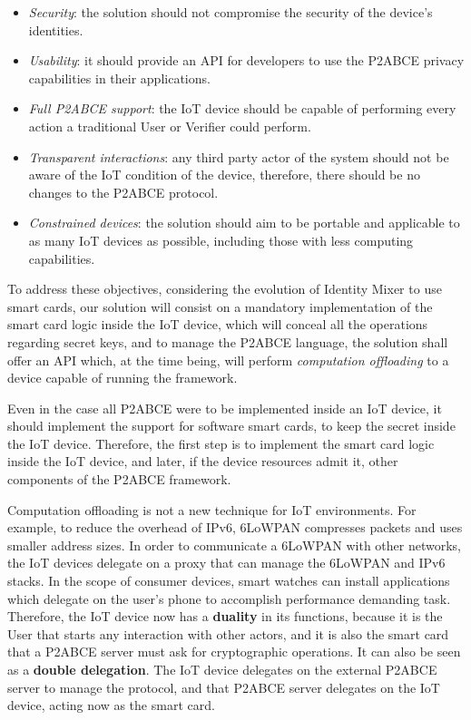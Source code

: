 \begin{itemize}
	\item \textit{Security}: the solution should not compromise the security of the device's identities.
	\item \textit{Usability}: it should provide an API for developers to use the P2ABCE privacy capabilities in their applications.
	\item \textit{Full P2ABCE support}: the IoT device should be capable of performing every action a traditional User or Verifier could perform.
	\item \textit{Transparent interactions}: any third party actor of the system should not be aware of the IoT condition of the device, therefore, there should be no changes to the P2ABCE protocol.
	\item \textit{Constrained devices}: the solution should aim to be portable and applicable to as many IoT devices as possible, including those with less computing capabilities.
\end{itemize}

\hfil

To address these objectives, considering the evolution of Identity Mixer to use smart cards, our solution will consist on a mandatory implementation of the smart card logic inside the IoT device, which will conceal all the operations regarding secret keys, and to manage the P2ABCE language, the solution shall offer an API which, at the time being, will perform \textit{computation offloading} to a device capable of running the framework.

Even in the case all P2ABCE were to be implemented inside an IoT device, it should implement the support for software smart cards, to keep the secret inside the IoT device. Therefore, the first step is to implement the smart card logic inside the IoT device, and later, if the device resources admit it, other components of the P2ABCE framework.

Computation offloading is not a new technique for IoT environments. For example, to reduce the overhead of IPv6, 6LoWPAN compresses packets and uses smaller address sizes. In order to communicate a 6LoWPAN with other networks, the IoT devices delegate on a proxy that can manage the 6LoWPAN and IPv6 stacks. In the scope of consumer devices, smart watches can install applications which delegate on the user's phone to accomplish performance demanding task. 
Therefore, the IoT device now has a \textbf{duality} in its functions, because it is the User that starts any interaction with other actors, and it is also the smart card that a P2ABCE server must ask for cryptographic operations. It can also be seen as a \textbf{double delegation}. The IoT device delegates on the external P2ABCE server to manage the protocol, and that P2ABCE server delegates on the IoT device, acting now as the smart card.

